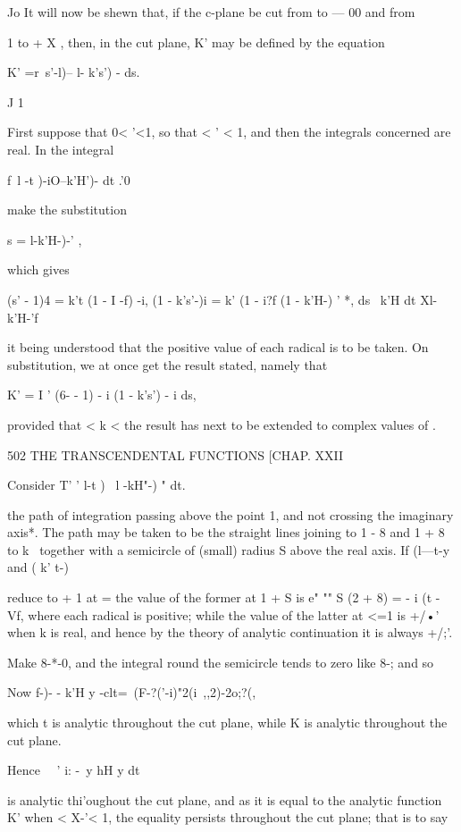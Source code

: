 Jo It will now be shewn that, if the c-plane be cut from to — 00 and
from

1 to + X , then, in the cut plane, K' may be defined by the equation

K' =r\ s'-l)-- l- k's') - ds.

J 1

First suppose that 0< '<1, so that < ' < 1, and then the integrals
concerned are real. In the integral

f\ l -t )-iO--k'H')- dt .'0

make the substitution

s = l-k'H-)-' ,

which gives

(s' - 1)4 = k't (1 - I -f) -i, (1 - k's'-)i = k' (1 - i?f (1 - k'H-) '
*, ds \ k'H dt Xl-k'H-'f

it being understood that the positive value of each radical is to be
taken. On substitution, we at once get the result stated, namely that

K' = I ' (6- - 1) - i (1 - k's') - i ds,

provided that < k <\; the result has next to be extended to complex
values of .

502 THE TRANSCENDENTAL FUNCTIONS [CHAP. XXII

Consider T' ' l-t )~ l -kH"-) " dt.

the path of integration passing above the point 1, and not crossing
the imaginary axis*. The path may be taken to be the straight lines
joining to 1 - 8 and 1 + 8 to k~ together with a semicircle of (small)
radius S above the real axis. If (l—t-y and ( k' t-)

reduce to + 1 at = the value of the former at 1 + S is e" "" S (2 + 8)
= - i (t - Vf, where each radical is positive; while the value of the
latter at <=1 is +/•' when k is real, and hence by the theory of
analytic continuation it is always +/;'.

Make 8-*-0, and the integral round the semicircle tends to zero like
8-; and so

Now f-)- - k'H y -clt=\ (F-?('-i)"2(i\ ,,2)-2o;?(,

which t is analytic throughout the cut plane, while K is analytic
throughout the cut plane.

Hence \ \ ' i: -\ y hH y dt

is analytic thi'oughout the cut plane, and as it is equal to the
analytic function K' when < X-'< 1, the equality persists throughout
the cut plane; that is to say

